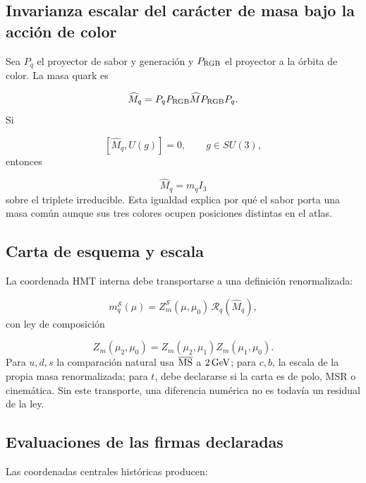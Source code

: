\subsection{Invarianza escalar del carácter de masa bajo la acción de color}
Sea \(P_q\) el proyector de sabor y generación y \(P_{\rm RGB}\) el proyector a la órbita de color. La masa quark es

\[
 \widehat M_q=
 P_qP_{\rm RGB}\widehat M P_{\rm RGB}P_q.
\]
Si

\[
 [\widehat M_q,U(g)]=0,\qquad g\in SU(3),
\]
entonces

\[
 \widehat M_q=m_qI_3
\]
sobre el triplete irreducible. Esta igualdad explica por qué el sabor porta una masa común aunque sus tres colores ocupen posiciones distintas en el atlas.

\subsection{Carta de esquema y escala}
La coordenada HMT interna debe transportarse a una definición renormalizada:

\[
 m_q^{\mathcal S}(\mu)
 =Z_m^{\mathcal S}(\mu,\mu_0)\,
 \mathcal R_q(\widehat M_q),
\]
con ley de composición

\[
 Z_m(\mu_2,\mu_0)
 =Z_m(\mu_2,\mu_1)Z_m(\mu_1,\mu_0).
\]
Para \(u,d,s\) la comparación natural usa \(\overline{\rm MS}\) a \(2\,{\rm GeV}\); para \(c,b\), la escala de la propia masa renormalizada; para \(t\), debe declararse si la carta es de polo, MSR o cinemática. Sin este transporte, una diferencia numérica no es todavía un residual de la ley.

\subsection{Evaluaciones de las firmas declaradas}
Las coordenadas centrales históricas producen:


